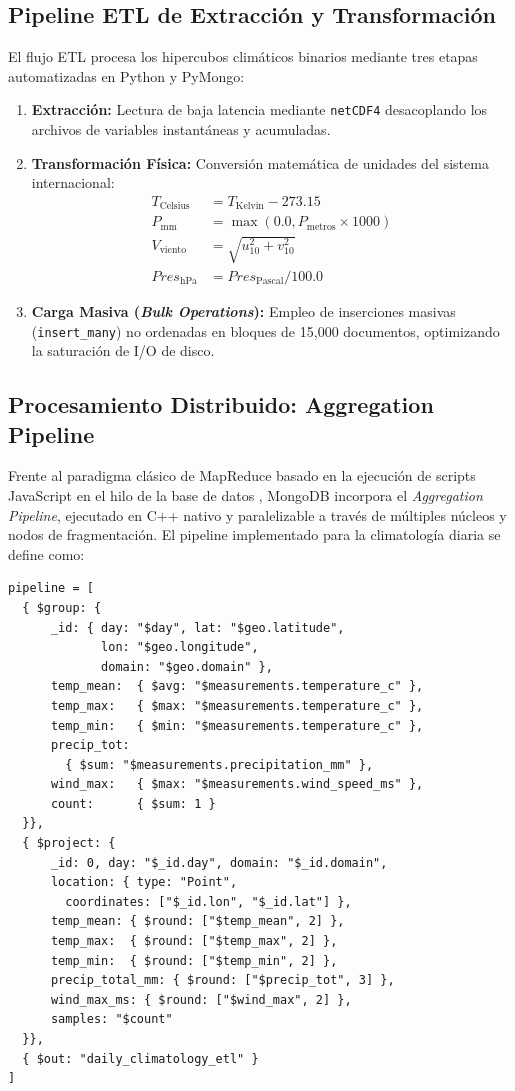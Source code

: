 \documentclass[conference]{IEEEtran}
\begin{document}
\subsection{Pipeline ETL de Extracción y Transformación}
El flujo ETL procesa los hipercubos climáticos binarios mediante tres etapas automatizadas en Python y PyMongo:
\begin{enumerate}
    \item \textbf{Extracción:} Lectura de baja latencia mediante \texttt{netCDF4} desacoplando los archivos de variables instantáneas y acumuladas.
    \item \textbf{Transformación Física:} Conversión matemática de unidades del sistema internacional:
    \begin{align}
        T_{\text{Celsius}} &= T_{\text{Kelvin}} - 273.15 \\
        P_{\text{mm}} &= \max(0.0, P_{\text{metros}} \times 1000) \\
        V_{\text{viento}} &= \sqrt{u_{10}^2 + v_{10}^2} \\
        Pres_{\text{hPa}} &= Pres_{\text{Pascal}} / 100.0
    \end{align}
    \item \textbf{Carga Masiva (\textit{Bulk Operations}):} Empleo de inserciones masivas (\texttt{insert\_many}) no ordenadas en bloques de 15,000 documentos, optimizando la saturación de I/O de disco.
\end{enumerate}

\subsection{Procesamiento Distribuido: Aggregation Pipeline}
Frente al paradigma clásico de MapReduce basado en la ejecución de scripts JavaScript en el hilo de la base de datos \cite{dean2008mapreduce}, MongoDB incorpora el \textit{Aggregation Pipeline}, ejecutado en C++ nativo y paralelizable a través de múltiples núcleos y nodos de fragmentación. El pipeline implementado para la climatología diaria se define como:

\begin{scriptsize}
\begin{verbatim}
pipeline = [
  { $group: {
      _id: { day: "$day", lat: "$geo.latitude",
             lon: "$geo.longitude",
             domain: "$geo.domain" },
      temp_mean:  { $avg: "$measurements.temperature_c" },
      temp_max:   { $max: "$measurements.temperature_c" },
      temp_min:   { $min: "$measurements.temperature_c" },
      precip_tot:
        { $sum: "$measurements.precipitation_mm" },
      wind_max:   { $max: "$measurements.wind_speed_ms" },
      count:      { $sum: 1 }
  }},
  { $project: {
      _id: 0, day: "$_id.day", domain: "$_id.domain",
      location: { type: "Point",
        coordinates: ["$_id.lon", "$_id.lat"] },
      temp_mean: { $round: ["$temp_mean", 2] },
      temp_max:  { $round: ["$temp_max", 2] },
      temp_min:  { $round: ["$temp_min", 2] },
      precip_total_mm: { $round: ["$precip_tot", 3] },
      wind_max_ms: { $round: ["$wind_max", 2] },
      samples: "$count"
  }},
  { $out: "daily_climatology_etl" }
]
\end{verbatim}
\end{scriptsize}
\end{document}
